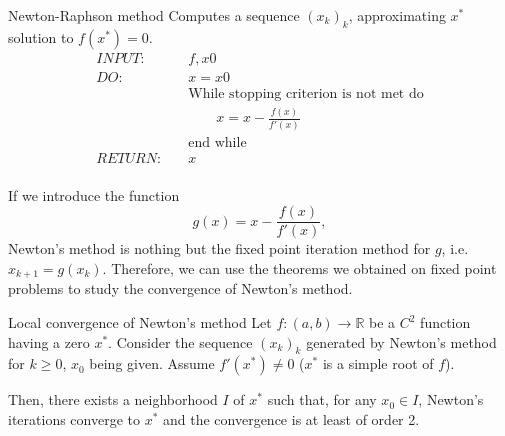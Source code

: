 \documentclass{article}
\begin{document}
        \vspace{10pt}

        \begin{algo}{Newton-Raphson method}
            Computes a sequence $(x_k)_k$, approximating $x^*$ solution to $f(x^*)=0$.
            \begin{align*}
            INPUT:&\quad{} f, x0\\
            DO:&\quad{} x = x0\\
            &\quad{} \text{While stopping criterion is not met do}\\
            &\quad{}\quad{}\quad{} x = x - \frac{f(x)}{f'(x)}\\
            &\quad{} \text{end while}\\
            RETURN:&\quad{} x\\
            \end{align*}
        \end{algo}

        \vspace{10pt}

        \begin{remark}
            If we introduce the function
            $$
            g(x) = x - \frac{f(x)}{f'(x)},
            $$
            Newton's method is nothing but the fixed point iteration method for $g$, i.e. $x_{k+1} = g(x_k)$. Therefore, we can use the theorems we obtained on fixed point problems to study the convergence of Newton's method.
        \end{remark}

        \begin{theorem}{Local convergence of Newton's method}
            Let $f: (a,b)\to \mathbb{R}$ be a $C^2$ function having a zero $x^*$. Consider the sequence $(x_k)_k$ generated by Newton's method for $k\geq 0$, $x_0$ being given. Assume $f'(x^*)\neq 0$ ($x^*$ is a simple root of $f$).

            \vspace{6pt}
                
            Then, there exists a neighborhood $I$ of $x^*$ such that, for any $x_0\in I$, Newton's iterations converge to $x^*$ and the convergence is at least of order 2.
        \end{theorem}

        \vspace{10pt}
\end{document}
